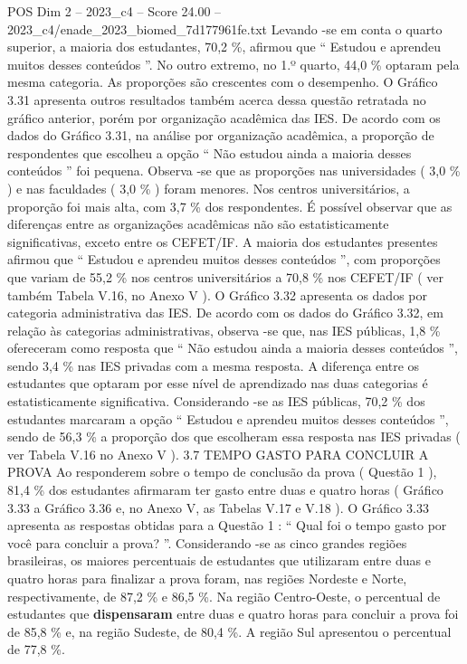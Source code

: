 \begin{textsample}{POS Dim 2 – 2023\_c4 – Score 24.00 – 2023\_c4/enade\_2023\_biomed\_7d177961fe.txt}
Levando -se em conta o quarto superior, a maioria dos estudantes, 70,2 \%, afirmou que “ Estudou e aprendeu muitos desses conteúdos ”.
No outro extremo, no 1.º quarto, 44,0 \% optaram pela mesma categoria.
As proporções são crescentes com o desempenho.
O Gráfico 3.31 apresenta outros resultados também acerca dessa questão retratada no gráfico anterior, porém por organização acadêmica das IES.
De acordo com os dados do Gráfico 3.31, na análise por organização acadêmica, a proporção de respondentes que escolheu a opção “ Não estudou ainda a maioria desses conteúdos ” foi pequena.
Observa -se que as proporções nas universidades ( 3,0 \% ) e nas faculdades ( 3,0 \% ) foram menores.
Nos centros universitários, a proporção foi mais alta, com 3,7 \% dos respondentes.
É possível observar que as diferenças entre as organizações acadêmicas não são estatisticamente significativas, exceto entre os CEFET/IF.
A maioria dos estudantes presentes afirmou que “ Estudou e aprendeu muitos desses conteúdos ”, com proporções que variam de 55,2 \% nos centros universitários a 70,8 \% nos CEFET/IF ( ver também Tabela V.16, no Anexo V ).
O Gráfico 3.32 apresenta os dados por categoria administrativa das IES.
De acordo com os dados do Gráfico 3.32, em relação às categorias administrativas, observa -se que, nas IES públicas, 1,8 \% ofereceram como resposta que “ Não estudou ainda a maioria desses conteúdos ”, sendo 3,4 \% nas IES privadas com a mesma resposta.
A diferença entre os estudantes que optaram por esse nível de aprendizado nas duas categorias é estatisticamente significativa.
Considerando -se as IES públicas, 70,2 \% dos estudantes marcaram a opção “ Estudou e aprendeu muitos desses conteúdos ”, sendo de 56,3 \% a proporção dos que escolheram essa resposta nas IES privadas ( ver Tabela V.16 no Anexo V ). 3.7 TEMPO GASTO PARA CONCLUIR A PROVA Ao responderem sobre o tempo de conclusão da prova ( Questão 1 ), 81,4 \% dos estudantes afirmaram ter gasto entre duas e quatro horas ( Gráfico 3.33 a Gráfico 3.36 e, no Anexo V, as Tabelas V.17 e V.18 ).
O Gráfico 3.33 apresenta as respostas obtidas para a Questão 1 : “ Qual foi o tempo gasto por você para concluir a prova? ”.
Considerando -se as cinco grandes regiões brasileiras, os maiores percentuais de estudantes que utilizaram entre duas e quatro horas para finalizar a prova foram, nas regiões Nordeste e Norte, respectivamente, de 87,2 \% e 86,5 \%.
Na região Centro-Oeste, o percentual de estudantes que \textbf{dispensaram} entre duas e quatro horas para concluir a prova foi de 85,8 \% e, na região Sudeste, de 80,4 \%.
A região Sul apresentou o percentual de 77,8 \%.

\end{textsample}
